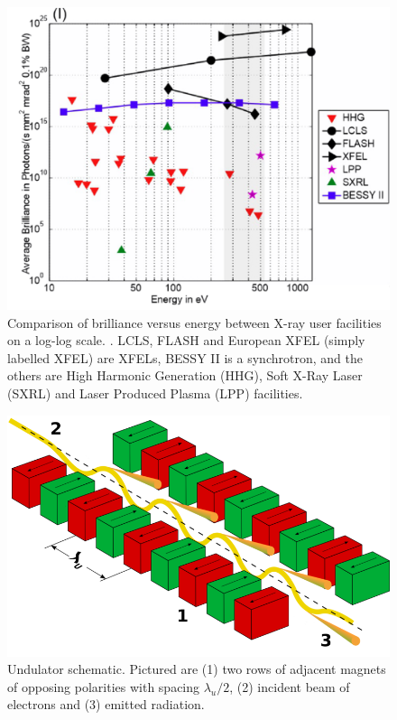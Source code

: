 \documentclass[aps,prb,twocolumn,superscriptaddress]{revtex4-2}
\begin{document}
\begin{figure}[h]
    \centering
    \includegraphics[width=0.9\linewidth]{Figures/XRaySourceBrilliance.png}
    \caption{Comparison of brilliance versus energy between X-ray user
        facilities on a log-log scale. \cite{Brilliance}. LCLS, FLASH and
        European XFEL (simply labelled XFEL) are XFELs, BESSY II is a
        synchrotron, and the others are High Harmonic Generation (HHG), Soft
        X-Ray Laser (SXRL) and Laser Produced Plasma (LPP) facilities.}
    \label{fig:brilliance}
\end{figure}

\begin{figure}[h]
    \centering
    \includegraphics[width=0.9\linewidth]{Figures/800px-Undulator.png}
    \caption{Undulator schematic. Pictured are (1) two rows of adjacent magnets 
        of opposing polarities with spacing $\lambda_u/2$, (2) incident beam of
        electrons and (3) emitted radiation.}
    \label{fig:Undulator}
\end{figure}
\end{document}

